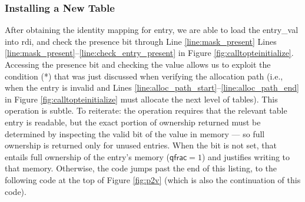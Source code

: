  \subsubsection{Installing a New Table}
 After obtaining the identity mapping for \textsf{entry}, we are able to load the \textsf{entry\_val} into \textsf{rdi}, and check the presence bit through
\ifPLDI
Line \ref{line:mask_present} %
\else
Lines \ref{line:mask_present}--\ref{line:check_entry_present} 
\fi
in Figure \ref{fig:calltopteinitialize}.
Accessing the presence bit and checking the value allows us to exploit the condition (*) that was just discussed when verifying the allocation
path (i.e., when the entry is invalid  and Lines \ref{line:alloc_path_start}--\ref{line:alloc_path_end} in Figure \ref{fig:calltopteinitialize}
must allocate the next level of tables).
This operation is subtle. To reiterate: the operation requires that the relevant table entry is readable, but the exact portion of ownership 
returned must be determined by inspecting the valid bit of the value in memory --- so full ownership is returned only for unused entries.
When the bit is not set, that entails full ownership of the entry's memory ($\textsf{qfrac} = 1$) and justifies writing to that memory.
Otherwise, the code jumps past the end of this listing, to the following code at the top of Figure \ref{fig:p2v} (which is also the
continuation of this code).

